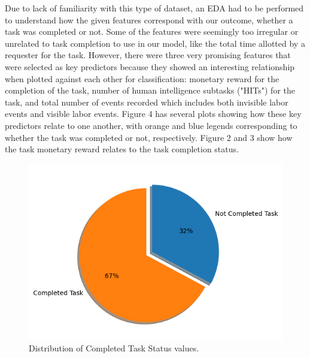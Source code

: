 \documentclass[11pt]{article}
\begin{document}
Due to lack of familiarity with this type of dataset, an EDA had to be performed to understand how the given features correspond with our outcome, whether a task was completed or not. Some of the features were seemingly too irregular or unrelated to task completion to use in our model, like the total time allotted by a requester for the task. However, there were three very promising features that were selected as key predictors because they showed an interesting relationship when plotted against each other for classification: monetary reward for the completion of the task, number of human intelligence subtasks ("HITs") for the task, and total number of events recorded which includes both invisible labor events and visible labor events. Figure 4 has several plots showing how these key predictors relate to one another, with orange and blue legends corresponding to whether the task was completed or not, respectively. Figure 2 and 3 show how the task monetary reward relates to the task completion status.

\begin{figure}[hbt!]
  \centering
  \includegraphics[width=\linewidth]{figures/distribution-completed-tasks-pie-chart}
  \caption{Distribution of Completed Task Status values.}
\end{figure}

\clearpage
\end{document}
